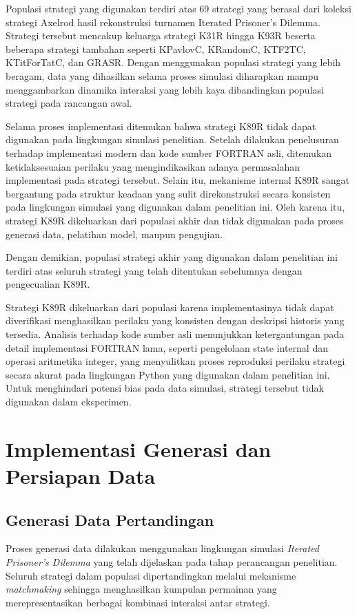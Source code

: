 Populasi strategi yang digunakan terdiri atas 69 strategi yang berasal dari koleksi strategi Axelrod hasil rekonstruksi turnamen Iterated Prisoner's Dilemma. Strategi tersebut mencakup keluarga strategi K31R hingga K93R beserta beberapa strategi tambahan seperti KPavlovC, KRandomC, KTF2TC, KTitForTatC, dan GRASR. Dengan menggunakan populasi strategi yang lebih beragam, data yang dihasilkan selama proses simulasi diharapkan mampu menggambarkan dinamika interaksi yang lebih kaya dibandingkan populasi strategi pada rancangan awal.

Selama proses implementasi ditemukan bahwa strategi K89R tidak dapat digunakan pada lingkungan simulasi penelitian. Setelah dilakukan penelusuran terhadap implementasi modern dan kode sumber FORTRAN asli, ditemukan ketidaksesuaian perilaku yang mengindikasikan adanya permasalahan implementasi pada strategi tersebut. Selain itu, mekanisme internal K89R sangat bergantung pada struktur keadaan yang sulit direkonstruksi secara konsisten pada lingkungan simulasi yang digunakan dalam penelitian ini. Oleh karena itu, strategi K89R dikeluarkan dari populasi akhir dan tidak digunakan pada proses generasi data, pelatihan model, maupun pengujian.

Dengan demikian, populasi strategi akhir yang digunakan dalam penelitian ini terdiri atas seluruh strategi yang telah ditentukan sebelumnya dengan pengecualian K89R.

Strategi K89R dikeluarkan dari populasi karena implementasinya tidak dapat diverifikasi menghasilkan perilaku yang konsisten dengan deskripsi historis yang tersedia. Analisis terhadap kode sumber asli menunjukkan ketergantungan pada detail implementasi FORTRAN lama, seperti pengelolaan state internal dan operasi aritmetika integer, yang menyulitkan proses reproduksi perilaku strategi secara akurat pada lingkungan Python yang digunakan dalam penelitian ini. Untuk menghindari potensi bias pada data simulasi, strategi tersebut tidak digunakan dalam eksperimen.

\section{Implementasi Generasi dan Persiapan Data}

\subsection{Generasi Data Pertandingan}

Proses generasi data dilakukan menggunakan lingkungan simulasi \textit{Iterated Prisoner's Dilemma} yang telah dijelaskan pada tahap perancangan penelitian. Seluruh strategi dalam populasi dipertandingkan melalui mekanisme \textit{matchmaking} sehingga menghasilkan kumpulan permainan yang merepresentasikan berbagai kombinasi interaksi antar strategi.

